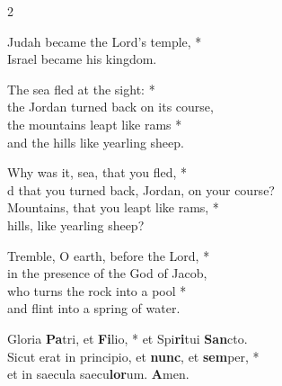\begin{multicols}{2}
    \small

    Judah became the Lord’s temple, *\\
    Israel became his kingdom.
    
    The sea fled at the sight: *\\
    the Jordan turned back on its course,\\
    the mountains leapt like rams *\\
    and the hills like yearling sheep.
    
    Why was it, sea, that you fled, *\\d
    that you turned back, Jordan, on your course?\\
    Mountains, that you leapt like rams, *\\
    hills, like yearling sheep?
    
    Tremble, O earth, before the Lord, *\\
    in the presence of the God of Jacob,\\
    who turns the rock into a pool *\\
    and flint into a spring of water.
    
    Gloria \textbf{Pa}tri, et \textbf{Fi}lio, * et Spi\textbf{ri}tui \textbf{San}cto. \\
    Sicut erat in principio, et \textbf{nunc}, et \textbf{sem}per, *\\
    et in saecula saecu\textbf{lor}um. \textbf{A}men.\\    
\end{multicols}
